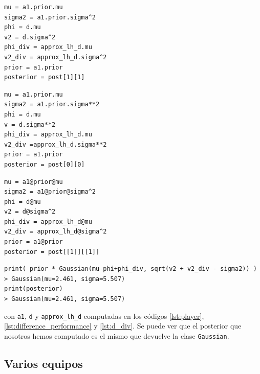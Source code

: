 \documentclass[a4paper,11pt]{book}
\theoremstyle{definition}
\begin{document}
\begin{paracol}{3}
\begin{lstlisting}[backgroundcolor=\color{julia!60},belowskip=-0.77 \baselineskip]
mu = a1.prior.mu
sigma2 = a1.prior.sigma^2
phi = d.mu
v2 = d.sigma^2
phi_div = approx_lh_d.mu
v2_div = approx_lh_d.sigma^2
prior = a1.prior
posterior = post[1][1]
\end{lstlisting}
\switchcolumn
\begin{lstlisting}[backgroundcolor=\color{python!60},belowskip=-0.77 \baselineskip]
mu = a1.prior.mu
sigma2 = a1.prior.sigma**2
phi = d.mu
v = d.sigma**2
phi_div = approx_lh_d.mu
v2_div =approx_lh_d.sigma**2
prior = a1.prior
posterior = post[0][0]
\end{lstlisting}
\switchcolumn
\begin{lstlisting}[backgroundcolor=\color{r!50},belowskip=-0.77 \baselineskip]
mu = a1@prior@mu
sigma2 = a1@prior@sigma^2
phi = d@mu
v2 = d@sigma^2
phi_div = approx_lh_d@mu
v2_div = approx_lh_d@sigma^2
prior = a1@prior
posterior = post[[1]][[1]]
\end{lstlisting}
\end{paracol}
\begin{lstlisting}[captionpos=b,backgroundcolor=\color{all},label=lst:posterior_s1_approx, caption={Accediendo al posterior aproximado},belowskip=0cm]
print( prior * Gaussian(mu-phi+phi_div, sqrt(v2 + v2_div - sigma2)) )
> Gaussian(mu=2.461, sigma=5.507)
print(posterior)
> Gaussian(mu=2.461, sigma=5.507)
\end{lstlisting}
%
con \texttt{a1}, \texttt{d} y \texttt{approx\_lh\_d} computadas en los códigos \ref{lst:player}, \ref{lst:difference_performance} y \ref{lst:d_div}.
%
Se puede ver que el posterior que nosotros hemos computado es el mismo que devuelve la clase \texttt{Gaussian}.

\subsection{Varios equipos} \label{sec:iterative_posterior}
\end{document}
